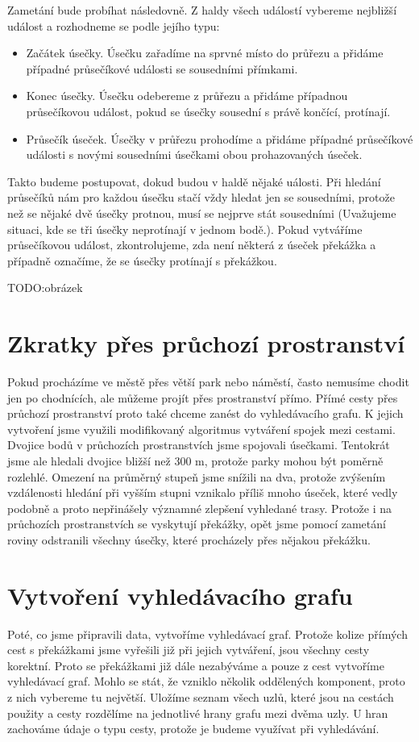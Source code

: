 Zametání bude probíhat následovně. Z haldy všech událostí vybereme nejbližší
událost a rozhodneme se podle jejího typu:
\begin{itemize}
	\item {\tuc Začátek úsečky.}  Úsečku zařadíme na sprvné místo do
	průřezu a přidáme případné průsečíkové události se sousedními přímkami.
	\item {\tuc Konec úsečky.} Úsečku odebereme z průřezu a přidáme
	případnou průsečíkovou událost, pokud se úsečky sousední s právě
	končící, protínají.
	\item {\tuc Průsečík úseček.} Úsečky v průřezu prohodíme a přidáme
	případné průsečíkové události s novými sousedními úsečkami obou
	prohazovaných úseček.
\end{itemize}
Takto budeme postupovat, dokud budou v haldě nějaké uálosti. Při hledání
průsečíků nám pro každou úsečku stačí vždy hledat jen se sousedními, protože než
se nějaké dvě úsečky protnou, musí se nejprve stát sousedními (Uvažujeme
situaci, kde se tři úsečky neprotínají v jednom bodě.). Pokud vytváříme
průsečíkovou událost, zkontrolujeme, zda není některá z úseček překážka a
případně označíme, že se úsečky protínají s překážkou. 

TODO:obrázek

\section{Zkratky přes průchozí prostranství}
Pokud procházíme ve městě přes větší park nebo náměstí, často nemusíme chodit
jen po chodnících, ale můžeme projít přes prostranství přímo. Přímé cesty přes
průchozí prostranství proto také chceme zanést do vyhledávacího grafu. K jejich
vytvoření jsme využili modifikovaný algoritmus vytváření spojek mezi cestami.
Dvojice bodů v průchozích prostranstvích jsme spojovali úsečkami. Tentokrát jsme
ale hledali dvojice bližší než 300 m, protože parky mohou být poměrně rozlehlé.
Omezení na průměrný stupeň jsme snížili na dva, protože zvýšením vzdálenosti
hledání při vyšším stupni vznikalo příliš mnoho úseček, které vedly podobně a
proto nepřinášely významné zlepšení vyhledané trasy. Protože i na průchozích
prostranstvích se vyskytují překážky, opět jsme pomocí zametání roviny
odstranili všechny úsečky, které procházely přes nějakou překážku.

\section{Vytvoření vyhledávacího grafu}
Poté, co jsme připravili data, vytvoříme vyhledávací graf. Protože kolize
přímých cest s překážkami jsme vyřešili již při jejich vytváření, jsou všechny
cesty korektní. Proto se překážkami již dále nezabýváme a pouze z cest vytvoříme
vyhledávací graf. Mohlo se stát, že vzniklo několik oddělených komponent, proto
z nich vybereme tu největší. Uložíme seznam všech uzlů, které jsou na cestách
použity a cesty rozdělíme na jednotlivé hrany grafu mezi dvěma uzly. U hran
zachováme údaje o typu cesty, protože je budeme využívat při vyhledávání.
